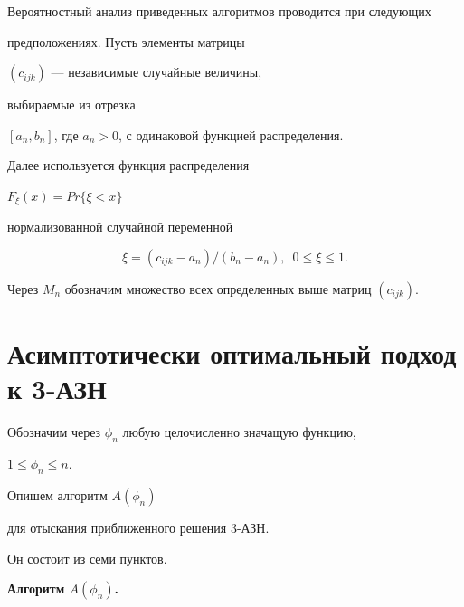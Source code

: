 Вероятностный анализ приведенных алгоритмов проводится при следующих 


предположениях. Пусть элементы матрицы


$(c_{ijk})$ --- независимые случайные величины, 


выбираемые из отрезка


$[a_n, b_n]$, где $a_n >0$, с одинаковой функцией распределения.


Далее используется функция распределения


$F_{\xi}(x) = Pr \{\xi < x \}$ 


нормализованной случайной переменной 


$$


\xi = (c_{ijk} - a_n)/(b_n - a_n), \ \;


0 \le \xi \le 1.


$$ 


Через $M_{n}$ обозначим множество всех определенных выше матриц $(c_{ijk})$.





\section{Асимптотически оптимальный подход к 3-АЗН}





Обозначим через $\phi_n $ любую целочисленно значащую функцию,


$1 \le \phi_n \le n$.





Опишем алгоритм $ A(\phi_n)$ 


для отыскания приближенного решения 3-АЗН.


Он состоит из семи пунктов.


\medskip





{\bf Алгоритм $A(\phi_n)$.}


